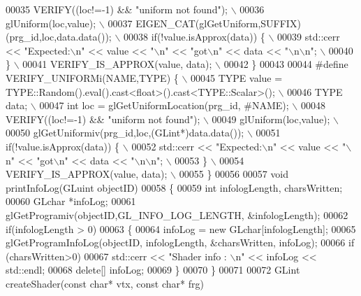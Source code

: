 \begin{DoxyCode}
00035 \textcolor{preprocessor}{    VERIFY((loc!=-1) && "uniform not found"); \(\backslash\)}
00036 \textcolor{preprocessor}{    glUniform(loc,value); \(\backslash\)}
00037 \textcolor{preprocessor}{    EIGEN\_CAT(glGetUniform,SUFFIX)(prg\_id,loc,data.data()); \(\backslash\)}
00038 \textcolor{preprocessor}{    if(!value.isApprox(data)) \{ \(\backslash\)}
00039 \textcolor{preprocessor}{      std::cerr << "Expected:\(\backslash\)n" << value << "\(\backslash\)n" << "got\(\backslash\)n" << data << "\(\backslash\)n\(\backslash\)n"; \(\backslash\)}
00040 \textcolor{preprocessor}{    \} \(\backslash\)}
00041 \textcolor{preprocessor}{    VERIFY\_IS\_APPROX(value, data); \(\backslash\)}
00042 \textcolor{preprocessor}{  \}}
00043   
00044 \textcolor{preprocessor}{#define VERIFY\_UNIFORMi(NAME,TYPE) \{ \(\backslash\)}
00045 \textcolor{preprocessor}{    TYPE value = TYPE::Random().eval().cast<float>().cast<TYPE::Scalar>(); \(\backslash\)}
00046 \textcolor{preprocessor}{    TYPE data; \(\backslash\)}
00047 \textcolor{preprocessor}{    int loc = glGetUniformLocation(prg\_id, #NAME); \(\backslash\)}
00048 \textcolor{preprocessor}{    VERIFY((loc!=-1) && "uniform not found"); \(\backslash\)}
00049 \textcolor{preprocessor}{    glUniform(loc,value); \(\backslash\)}
00050 \textcolor{preprocessor}{    glGetUniformiv(prg\_id,loc,(GLint*)data.data()); \(\backslash\)}
00051 \textcolor{preprocessor}{    if(!value.isApprox(data)) \{ \(\backslash\)}
00052 \textcolor{preprocessor}{      std::cerr << "Expected:\(\backslash\)n" << value << "\(\backslash\)n" << "got\(\backslash\)n" << data << "\(\backslash\)n\(\backslash\)n"; \(\backslash\)}
00053 \textcolor{preprocessor}{    \} \(\backslash\)}
00054 \textcolor{preprocessor}{    VERIFY\_IS\_APPROX(value, data); \(\backslash\)}
00055 \textcolor{preprocessor}{  \}}
00056   
00057 \textcolor{keywordtype}{void} printInfoLog(GLuint objectID)
00058 \{
00059     \textcolor{keywordtype}{int} infologLength, charsWritten;
00060     GLchar *infoLog;
00061     glGetProgramiv(objectID,GL\_INFO\_LOG\_LENGTH, &infologLength);
00062     \textcolor{keywordflow}{if}(infologLength > 0)
00063     \{
00064         infoLog = \textcolor{keyword}{new} GLchar[infologLength];
00065         glGetProgramInfoLog(objectID, infologLength, &charsWritten, infoLog);
00066         \textcolor{keywordflow}{if} (charsWritten>0)
00067           std::cerr << \textcolor{stringliteral}{"Shader info : \(\backslash\)n"} << infoLog << std::endl;
00068         \textcolor{keyword}{delete}[] infoLog;
00069     \}
00070 \}
00071 
00072 GLint createShader(\textcolor{keyword}{const} \textcolor{keywordtype}{char}* vtx, \textcolor{keyword}{const} \textcolor{keywordtype}{char}* frg)

\end{DoxyCode}

